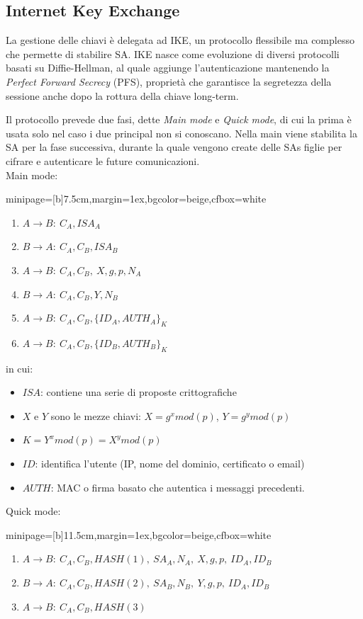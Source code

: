 \documentclass[a4paper, 11pt, notitlepage, fleqn]{report}
\newcommand{\fromto}[2]{#1\rightarrow #2\!:\ }
\newenvironment{colbox}[2]%
{%
	\par\noindent\hspace{10pt}
	\begin{adjustbox}{minipage=[b]{#2},margin=1ex,bgcolor=#1,cfbox=white}
}{%
	\end{adjustbox}\newline%
}
\begin{document}
\subsection{Internet Key Exchange}
La gestione delle chiavi è delegata ad IKE, un protocollo flessibile ma complesso che permette di stabilire SA. IKE nasce come evoluzione di diversi protocolli basati su Diffie-Hellman, al quale aggiunge l'autenticazione mantenendo la \emph{Perfect Forward Secrecy} (PFS), proprietà che garantisce la segretezza della sessione anche dopo la rottura della chiave long-term.

Il protocollo prevede due fasi, dette \emph{Main mode} e \emph{Quick mode}, di cui la prima è usata solo nel caso i due principal non si conoscano. Nella main viene stabilita la SA per la fase successiva, durante la quale vengono create delle SAs figlie per cifrare e autenticare le future comunicazioni.\\
Main mode:
\begin{colbox}{beige}{7.5cm}
	\begin{enumerate}
		\item $\fromto{A}{B}C_A,ISA_A$
		\item $\fromto{B}{A}C_A,C_B,ISA_B$
		\item $\fromto{A}{B}C_A,C_B,\ X,g,p,N_A$
		\item $\fromto{B}{A}C_A,C_B,Y,N_B$
		\item $\fromto{A}{B}C_A,C_B,\{ID_A,AUTH_A\}_K$
		\item $\fromto{A}{B}C_A,C_B,\{ID_B,AUTH_B\}_K$
	\end{enumerate}
\end{colbox}
in cui:
\begin{itemize}
	\item $ISA$: contiene una serie di proposte crittografiche
	\item $X$ e $Y$ sono le mezze chiavi: $X = g^xmod(p)$, $Y = g^ymod(p)$
	\item $K = Y^xmod(p) = X^ymod(p)$
	\item $ID$: identifica l'utente (IP, nome del dominio, certificato o email)
	\item $AUTH$: MAC o firma basato che autentica i messaggi precedenti.
\end{itemize}
Quick mode:
\begin{colbox}{beige}{11.5cm}
	\begin{enumerate}
		\item $\fromto{A}{B}C_A,C_B,HASH(1),\ SA_A,N_A,\ X,g,p,\ ID_A,ID_B$
		\item $\fromto{B}{A}C_A,C_B,HASH(2),\ SA_B,N_B,\ Y,g,p,\ ID_A,ID_B$
		\item $\fromto{A}{B}C_A,C_B,HASH(3)$
	\end{enumerate}
\end{colbox}
\end{document}

